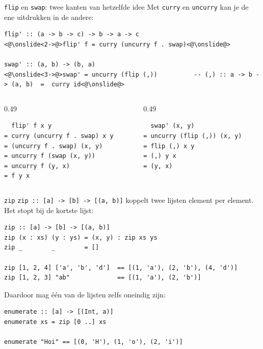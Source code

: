 \documentclass[aspectratio=169,11pt]{beamer}
\newcommand{\hs}{\lstinline[style=hsinline]}
\begin{document}
\begin{frame}[fragile]{\texttt{flip} en \texttt{swap}: twee kanten van hetzelfde idee}
Met \hs|curry| en \hs|uncurry| kan je de ene uitdrukken in de andere:
\begin{lstlisting}
flip' :: (a -> b -> c) -> b -> a -> c
<@\onslide<2->@>flip' f = curry (uncurry f . swap)<@\onslide@>

swap' :: (a, b) -> (b, a)
<@\onslide<3->@>swap' = uncurry (flip (,))          -- (,) :: a -> b -> (a, b)  =  curry id<@\onslide@>
\end{lstlisting}
\begin{columns}[T,onlytextwidth]
    \begin{column}{0.49\textwidth}
\begin{lstlisting}
  flip' f x y
= curry (uncurry f . swap) x y
= (uncurry f . swap) (x, y)
= uncurry f (swap (x, y))
= uncurry f (y, x)
= f y x
\end{lstlisting}
    \end{column}
    \begin{column}{0.49\textwidth}
\begin{lstlisting}
  swap' (x, y)
= uncurry (flip (,)) (x, y)
= flip (,) x y
= (,) y x
= (y, x)
\end{lstlisting}
    \end{column}
\end{columns}
\end{frame}
\begin{frame}[fragile]{\texttt{zip}}
  \hs|zip :: [a] -> [b] -> [(a, b)]| koppelt twee lijsten element per element.
  Het stopt bij de \alert{kortste} lijst:
\begin{lstlisting}[aboveskip=2pt]
zip :: [a] -> [b] -> [(a, b)]
zip (x : xs) (y : ys) = (x, y) : zip xs ys
zip _        _        = []

zip [1, 2, 4] ['a', 'b', 'd']  == [(1, 'a'), (2, 'b'), (4, 'd')]
zip [1, 2, 3] "ab"             == [(1, 'a'), (2, 'b')]
\end{lstlisting}
  Daardoor mag één van de lijsten zelfs oneindig zijn:
\begin{lstlisting}
enumerate :: [a] -> [(Int, a)]
enumerate xs = zip [0 ..] xs

enumerate "Hoi" == [(0, 'H'), (1, 'o'), (2, 'i')]
\end{lstlisting}
\end{frame}
\end{document}
